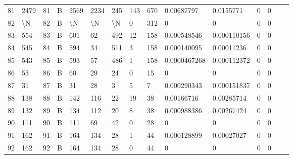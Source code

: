 \begin{longtable}{lllllllllllllll}
	81  & 2479              & 81  & B   & 2569              & 2234              & 245               & 143  & 670        & 0.00687797     & 0.0155771      & 0             & 0            \\
	82  & \textbackslash{}N & 82  & B   & \textbackslash{}N & \textbackslash{}N & \textbackslash{}N & 0    & 312        & 0              & 0              & 0             & 0            \\
	83  & 554               & 83  & B   & 601               & 62                & 492               & 12   & 158        & 0.000548546    & 0.000110156    & 0             & 0            \\
	84  & 545               & 84  & B   & 594               & 34                & 511               & 3    & 158        & 0.000140095    & 0.00011236     & 0             & 0            \\
	85  & 543               & 85  & B   & 593               & 57                & 486               & 1    & 158        & 0.0000467268   & 0.000112372    & 0             & 0            \\
	86  & 53                & 86  & B   & 60                & 29                & 24                & 0    & 15         & 0              & 0              & 0             & 0            \\
	87  & 31                & 87  & B   & 31                & 28                & 3                 & 5    & 7          & 0.000290343    & 0.000151837    & 0             & 0            \\
	88  & 138               & 88  & B   & 142               & 116               & 22                & 19   & 38         & 0.00166716     & 0.00285714     & 0             & 0            \\
	89  & 132               & 89  & B   & 134               & 112               & 20                & 8    & 38         & 0.000988386    & 0.00267424     & 0             & 0            \\
	90  & 111               & 90  & B   & 111               & 69                & 42                & 0    & 28         & 0              & 0              & 0             & 0            \\
	91  & 162               & 91  & B   & 164               & 134               & 28                & 1    & 44         & 0.000128899    & 0.00027027     & 0             & 0            \\
	92  & 162               & 92  & B   & 164               & 134               & 28                & 0    & 44         & 0              & 0              & 0             & 0            \\

\end{longtable}
